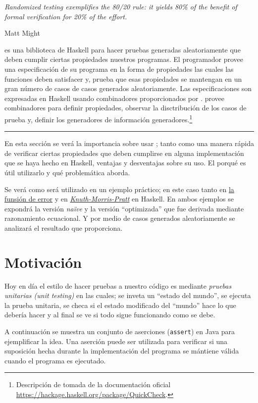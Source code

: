 \epigraph{\itshape Randomized testing exemplifies the 80/20 rule: it yields 80\% of the benefit
of formal verification for 20\% of the effort.}{Matt Might}

\QuickCheck es una biblioteca de Haskell para hacer pruebas generadas aleatoriamente que deben
cumplir ciertas propiedades nuestros programas. El programador provee una especificación de su
programa en la forma de propiedades las cuales las funciones deben satisfacer y, \QuickCheck prueba
que esas propiedades se mantengan en un gran número de casos de casos generados aleatoriamente. Las
especificaciones son expresadas en Haskell usando combinadores proporcionados por \QuickCheck.
\QuickCheck provee combinadores para definir propiedades, observar la disctribución de los casos
de prueba y, definir los generadores de información generadores.\footnote{
    Descripción de \QuickCheck tomada de la documentación oficial\\
    \url{https://hackage.haskell.org/package/QuickCheck}.
}

\noindent\rule{\textwidth}{1pt}

En esta sección se verá la importancia sobre usar \QuickCheck; tanto como una manera rápida de
verificar ciertas propiedades que deben cumplirse en alguna implementación que se haya hecho en
Haskell, ventajas y desventajas sobre su uso. El porqué es útil utilizarlo y qué problemática
aborda.

Se verá como será utilizado en un ejemplo práctico; en este caso tanto en
\hyperlink{funcional:funcion_error}{la funsión de error} y en
\hyperlink{funcional:kmp}{\textit{Knuth-Morris-Pratt}} en Haskell. En ambos ejemplos se expondrá la
versión \textit{naïve} y la versión ``optimizada'' que fue derivada mediante razonamiento
ecuacional. Y por medio de casos generados aleatoriamente se analizará el resultado que
\QuickCheck proporciona.

\section{Motivación}
Hoy en día el estilo de hacer pruebas a nuestro código es mediante \textit{pruebas unitarias (unit
testing)} en las cuales; se inveta un ``estado del mundo'', se ejecuta la prueba unitaria, se
checa si el estado modificado del ``mundo'' hace lo que debería hacer y al final se ve si todo
sigue funcionando como se debe.

A continuación se muestra un conjunto de aserciones (\texttt{assert}) en Java para ejemplificar
la idea. Una aserción puede ser utilizada para verificar si una suposición hecha durante la
implementación del programa se mántiene válida cuando el programa es ejecutado.

